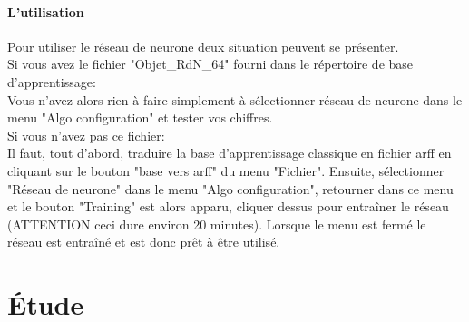 \documentclass[10pt,a4paper]{report}
\begin{document}
\paragraph{L'utilisation}
\begin{flushleft}
Pour utiliser le réseau de neurone deux situation peuvent se présenter.\\
\vspace*{0.1cm}
Si vous avez le fichier "Objet\_RdN\_64" fourni dans le répertoire de base d'apprentissage:\\
Vous n'avez alors rien à faire simplement à sélectionner réseau de neurone dans le menu "Algo configuration" et tester vos chiffres.\\
\vspace*{0.1cm}
Si vous n'avez pas ce fichier:\\
Il faut, tout d'abord, traduire la base d'apprentissage classique en fichier arff en cliquant sur le bouton "base vers arff" du menu "Fichier". Ensuite, sélectionner "Réseau de neurone" dans le menu "Algo configuration", retourner dans ce menu et le bouton "Training" est alors apparu, cliquer dessus pour entraîner le réseau (ATTENTION ceci dure environ 20 minutes). Lorsque le menu est fermé le réseau est entraîné et est donc prêt à être utilisé.

\end{flushleft}



\section{Étude}
\end{document}
